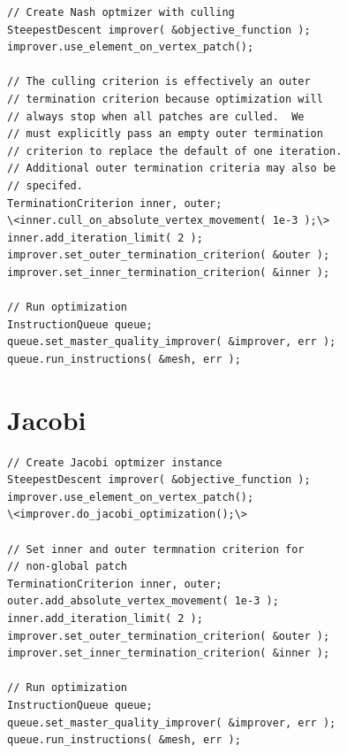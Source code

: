 \begin{lstlisting}[frame=single]
// Create Nash optmizer with culling
SteepestDescent improver( &objective_function );
improver.use_element_on_vertex_patch();

// The culling criterion is effectively an outer 
// termination criterion because optimization will 
// always stop when all patches are culled.  We 
// must explicitly pass an empty outer termination 
// criterion to replace the default of one iteration.
// Additional outer termination criteria may also be 
// specifed.
TerminationCriterion inner, outer;
\<inner.cull_on_absolute_vertex_movement( 1e-3 );\>
inner.add_iteration_limit( 2 );
improver.set_outer_termination_criterion( &outer );
improver.set_inner_termination_criterion( &inner );

// Run optimization
InstructionQueue queue;
queue.set_master_quality_improver( &improver, err );
queue.run_instructions( &mesh, err );
\end{lstlisting}

\section{Jacobi \label{sec:jacobi}}

\begin{lstlisting}[frame=single]
// Create Jacobi optmizer instance
SteepestDescent improver( &objective_function );
improver.use_element_on_vertex_patch();
\<improver.do_jacobi_optimization();\>

// Set inner and outer termnation criterion for 
// non-global patch
TerminationCriterion inner, outer;
outer.add_absolute_vertex_movement( 1e-3 );
inner.add_iteration_limit( 2 );
improver.set_outer_termination_criterion( &outer );
improver.set_inner_termination_criterion( &inner );

// Run optimization
InstructionQueue queue;
queue.set_master_quality_improver( &improver, err );
queue.run_instructions( &mesh, err );
\end{lstlisting}
